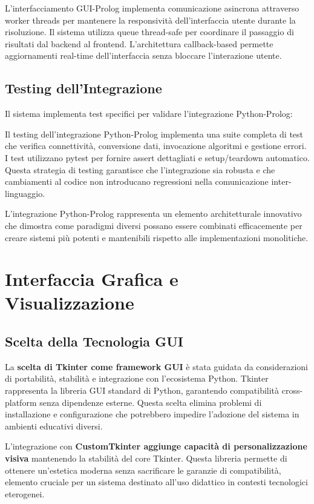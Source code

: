 \documentclass[12pt,a4paper]{report}
\theoremstyle{definition}
\begin{document}
L'interfacciamento GUI-Prolog implementa comunicazione asincrona attraverso worker threads per mantenere la responsività dell'interfaccia utente durante la risoluzione. Il sistema utilizza queue thread-safe per coordinare il passaggio di risultati dal backend al frontend. L'architettura callback-based permette aggiornamenti real-time dell'interfaccia senza bloccare l'interazione utente.

\section{Testing dell'Integrazione}

Il sistema implementa test specifici per validare l'integrazione Python-Prolog:

Il testing dell'integrazione Python-Prolog implementa una suite completa di test che verifica connettività, conversione dati, invocazione algoritmi e gestione errori. I test utilizzano pytest per fornire assert dettagliati e setup/teardown automatico. Questa strategia di testing garantisce che l'integrazione sia robusta e che cambiamenti al codice non introducano regressioni nella comunicazione inter-linguaggio.

L'integrazione Python-Prolog rappresenta un elemento architetturale innovativo che dimostra come paradigmi diversi possano essere combinati efficacemente per creare sistemi più potenti e mantenibili rispetto alle implementazioni monolitiche.

\chapter{Interfaccia Grafica e Visualizzazione}

\section{Scelta della Tecnologia GUI}

La \textbf{scelta di Tkinter come framework GUI} è stata guidata da considerazioni di portabilità, stabilità e integrazione con l'ecosistema Python. Tkinter rappresenta la libreria GUI standard di Python, garantendo compatibilità cross-platform senza dipendenze esterne. Questa scelta elimina problemi di installazione e configurazione che potrebbero impedire l'adozione del sistema in ambienti educativi diversi.

L'integrazione con \textbf{CustomTkinter aggiunge capacità di personalizzazione visiva} mantenendo la stabilità del core Tkinter. Questa libreria permette di ottenere un'estetica moderna senza sacrificare le garanzie di compatibilità, elemento cruciale per un sistema destinato all'uso didattico in contesti tecnologici eterogenei.
\end{document}
